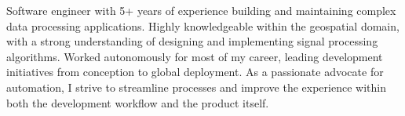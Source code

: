 \begin{justify}
Software engineer with 5+ years of experience building and maintaining complex data processing applications. Highly knowledgeable within the geospatial domain, with a strong understanding of designing and implementing signal processing algorithms. Worked autonomously for most of my career, leading development initiatives from conception to global deployment. As a passionate advocate for automation, I strive to streamline processes and improve the experience within both the development workflow and the product itself.
\end{justify}